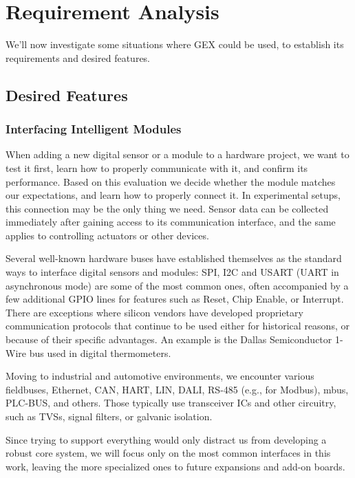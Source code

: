 \chapter{Requirement Analysis}

We'll now investigate some situations where GEX could be used, to establish its requirements and desired features.

\section{Desired Features}

\subsection{Interfacing Intelligent Modules}\label{sec:uses_digital_ifaces}

When adding a new digital sensor or a module to a hardware project, we want to test it first, learn how to properly communicate with it, and confirm its performance. Based on this evaluation we decide whether the module matches our expectations, and learn how to properly connect it. In experimental setups, this connection may be the only thing we need. Sensor data can be collected immediately after gaining access to its communication interface, and the same applies to controlling actuators or other devices.

Several well-known hardware buses have established themselves as the standard ways to interface digital sensors and modules: \gls{SPI}, \gls{I2C} and \gls{USART} (\gls{UART} in asynchronous mode) are some of the most common ones, often accompanied by a few additional \gls{GPIO} lines for features such as Reset, Chip Enable, or Interrupt. There are exceptions where silicon vendors have developed proprietary communication protocols that continue to be used either for historical reasons, or because of their specific advantages. An example is the Dallas Semiconductor 1-Wire bus used in digital thermometers.

Moving to industrial and automotive environments, we encounter various fieldbuses, Ethernet, \gls{CAN}, \gls{HART}, \gls{LIN}, \gls{DALI}, RS-485 (e.g., for Modbus), \gls{mbus}, PLC-BUS, and others. Those typically use transceiver \glspl{IC} and other circuitry, such as \glspl{TVS}, signal filters, or galvanic isolation. 

Since trying to support everything would only distract us from developing a robust core system, we will focus only on the most common interfaces in this work, leaving the more specialized ones to future expansions and add-on boards.

